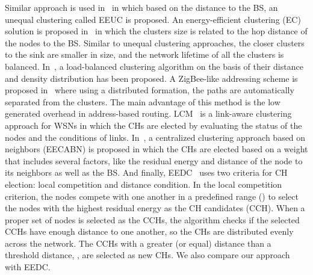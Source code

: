 \documentclass[journal]{IEEEtran}
\begin{document}
Similar approach is used in~\cite{UCR} in which based on the distance to the BS, an unequal clustering called EEUC is proposed.
An energy-efficient clustering (EC) solution is proposed in~\cite{EC2011} in which the clusters size is related to the hop distance of the nodes to the BS.  Similar to unequal clustering approaches, the closer clusters to the sink are smaller in size, and the network lifetime of all the clusters is balanced.   
In~\cite{load2013}, a load-balanced clustering algorithm on the basis of their distance and density distribution has been proposed.  A ZigBee-like addressing scheme is proposed in~\cite{pcc2012} where using a distributed formation, the paths are automatically separated from the clusters.  The main advantage of this method is the low generated overhead in address-based routing.
LCM~\cite{lcm2013} is a link-aware clustering approach for WSNs in which the CHs  are elected by evaluating the status of the nodes and the conditions of links. 
In~\cite{Wei2011}, a centralized clustering approach based on neighbors (EECABN) is proposed in which  the CHs are elected based on a weight that includes several factors, like the residual energy and distance of the node to its neighbors  as well as the BS.  And finally, EEDC~\cite{EEDC} uses two criteria for CH election: local competition and distance condition. In the local competition criterion, the nodes compete with one another in a predefined range ()  to select the nodes with the highest residual energy as the CH candidates (CCH). When a proper set of  nodes is selected as the CCHs, the algorithm checks if the selected CCHs have enough distance to one another, so the CHs are distributed evenly across the network. The CCHs with a greater (or equal) distance than a threshold distance, , are selected as new CHs.  We also compare our approach with EEDC.
\end{document}
